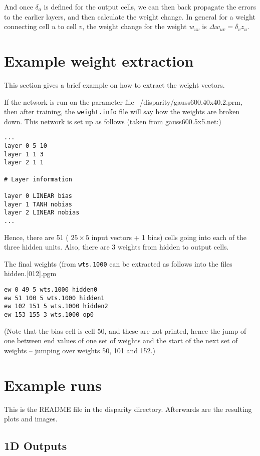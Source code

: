 \documentclass[a4paper]{article}
\begin{document}
And once $\delta_a$ is defined for the output cells, we can then back
propagate the errors to the earlier layers, and then calculate the
weight change.  In general for a weight connecting cell $u$ to cell
$v$, the weight change for the weight $w_{uv}$ is $\Delta w_{uv} =
\delta_v z_u$.


\section{Example weight extraction}

\label{egew}
This section gives a brief example on how to extract the weight
vectors.

If the network is run on the parameter file
~/disparity/gauss600.40x40.2.prm,  then after training, the
\texttt{weight.info} file will say how the weights are broken down.
This network is set up as follows (taken from gauss600.5x5.net:)

\begin{verbatim}
...
layer 0 5 10
layer 1 1 3
layer 2 1 1

# Layer information

layer 0 LINEAR bias
layer 1 TANH nobias
layer 2 LINEAR nobias
...
\end{verbatim}
Hence, there are 51 ( $2 5 \times 5$ input vectors + 1 bias) cells
going into each of the three hidden units. Also, there are $3$ weights from
hidden to output cells.

The final weights (from \texttt{wts.1000} can be extracted as follows
into the files hidden.[012].pgm

\begin{verbatim}
ew 0 49 5 wts.1000 hidden0
ew 51 100 5 wts.1000 hidden1
ew 102 151 5 wts.1000 hidden2
ew 153 155 3 wts.1000 op0
\end{verbatim}

(Note that the bias cell is cell 50, and these are not printed, hence
the jump of one between end values of one set of weights and the start
of the next set of weights -- jumping over weights 50, 101 and 152.)


\section{Example runs}
\label{egruns}
This is the README file in the disparity directory. Afterwards are the
resulting plots and images.




\clearpage
\subsection{1D Outputs}
\end{document}
